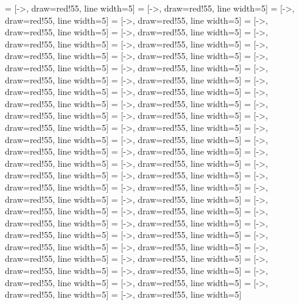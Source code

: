  = [->, draw=red!55, line width=5]
 = [->, draw=red!55, line width=5]
 = [->, draw=red!55, line width=5]
 = [->, draw=red!55, line width=5]
 = [->, draw=red!55, line width=5]
 = [->, draw=red!55, line width=5]
 = [->, draw=red!55, line width=5]
 = [->, draw=red!55, line width=5]
 = [->, draw=red!55, line width=5]
 = [->, draw=red!55, line width=5]
 = [->, draw=red!55, line width=5]
 = [->, draw=red!55, line width=5]
 = [->, draw=red!55, line width=5]
 = [->, draw=red!55, line width=5]
 = [->, draw=red!55, line width=5]
 = [->, draw=red!55, line width=5]
 = [->, draw=red!55, line width=5]
 = [->, draw=red!55, line width=5]
 = [->, draw=red!55, line width=5]
 = [->, draw=red!55, line width=5]
 = [->, draw=red!55, line width=5]
 = [->, draw=red!55, line width=5]
 = [->, draw=red!55, line width=5]
 = [->, draw=red!55, line width=5]
 = [->, draw=red!55, line width=5]
 = [->, draw=red!55, line width=5]
 = [->, draw=red!55, line width=5]
 = [->, draw=red!55, line width=5]
 = [->, draw=red!55, line width=5]
 = [->, draw=red!55, line width=5]
 = [->, draw=red!55, line width=5]
 = [->, draw=red!55, line width=5]
 = [->, draw=red!55, line width=5]
 = [->, draw=red!55, line width=5]
 = [->, draw=red!55, line width=5]
 = [->, draw=red!55, line width=5]
 = [->, draw=red!55, line width=5]
 = [->, draw=red!55, line width=5]
 = [->, draw=red!55, line width=5]
 = [->, draw=red!55, line width=5]
 = [->, draw=red!55, line width=5]
 = [->, draw=red!55, line width=5]
 = [->, draw=red!55, line width=5]
 = [->, draw=red!55, line width=5]
 = [->, draw=red!55, line width=5]
 = [->, draw=red!55, line width=5]
 = [->, draw=red!55, line width=5]
 = [->, draw=red!55, line width=5]
 = [->, draw=red!55, line width=5]
 = [->, draw=red!55, line width=5]
